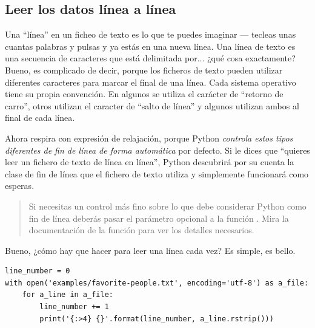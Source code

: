 \subsection{Leer los datos línea a línea}

Una ``línea'' en un ficheo de texto es lo que te puedes imaginar --- tecleas unas cuantas palabras y pulsas  y ya estás en una nueva línea. Una línea de texto es una secuencia de caracteres que está delimitada por... ¿qué cosa exactamente? Bueno, es complicado de decir, porque los ficheros de texto pueden utilizar diferentes caracteres para marcar el final de una línea. Cada sistema operativo tiene su propia convención. En algunos se utiliza el carácter de ``retorno de carro'', otros utilizan el caracter de ``salto de línea'' y algunos utilizan ambos al final de cada línea.

Ahora respira con expresión de relajación, porque Python \emph{controla estos tipos diferentes de fin de línea  de forma automática} por defecto. Si le dices que ``quieres leer un fichero de texto de línea en línea'', Python descubrirá por su cuenta la clase de fin de línea que el fichero de texto utiliza y simplemente funcionará como esperas.

\begin{quote}
Si necesitas un control más fino sobre lo que debe considerar Python como fin de línea deberás pasar el parámetro opcional  a la función . Mira la documentación de la función \href{http://docs.python.org/3.1/library/io.html#module-interface}{} para ver los detalles necesarios.
\end{quote}

Bueno, ¿cómo hay que hacer para leer una línea cada vez? Es simple, es bello.

\noindent\begin{minipage}{\textwidth}
\begin{lstlisting}[mathescape=True]
line_number = 0
with open('examples/favorite-people.txt', encoding='utf-8') as a_file:
    for a_line in a_file:
        line_number += 1
        print('{:>4} {}'.format(line_number, a_line.rstrip()))
\end{lstlisting}
\end{minipage}

